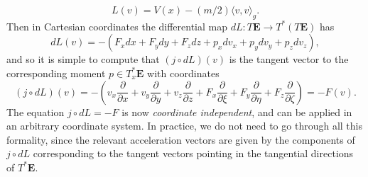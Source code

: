 %
\[ L(v) = V(x) - (m/2) \langle v, v \rangle_g. \]
%
Then in Cartesian coordinates the differential map $dL: T \mathbf{E} \to T^*(T \mathbf{E})$ has
%
\[ dL(v) = - \left( F_x dx + F_y dy + F_z dz + p_x dv_x + p_y dv_y + p_z dv_z \right), \]
%
and so it is simple to compute that $(j \circ dL)(v)$ is the tangent vector to the corresponding moment $p \in T^*_x \mathbf{E}$ with coordinates
%
\[ (j \circ dL)(v) = - \left( v_x \frac{\partial}{\partial x} + v_y \frac{\partial}{\partial y} + v_z \frac{\partial}{\partial z} + F_x \frac{\partial}{\partial \xi} + F_y \frac{\partial}{\partial \eta} + F_z \frac{\partial}{\partial \zeta} \right) = - F( v ). \]
%
The equation $j \circ dL = - F$ is now \emph{coordinate independent}, and can be applied in an arbitrary coordinate system. In practice, we do not need to go through all this formality, since the relevant acceleration vectors are given by the components of $j \circ dL$ corresponding to the tangent vectors pointing in the tangential directions of $T^* \mathbf{E}$.

